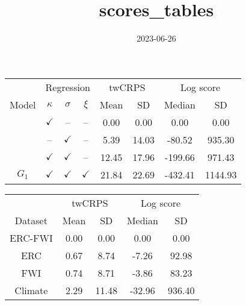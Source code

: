 \documentclass[
]{article}
\title{scores\_tables}
\author{}
\date{\vspace{-2.5em}2023-06-26}
\begin{document}
\maketitle

\begin{tabular}{cccccccc}
\toprule
\multicolumn{1}{c}{ } & \multicolumn{3}{c}{Regression} & \multicolumn{2}{c}{twCRPS} & \multicolumn{2}{c}{Log score} \\
\cmidrule(l{3pt}r{3pt}){2-4} \cmidrule(l{3pt}r{3pt}){5-6} \cmidrule(l{3pt}r{3pt}){7-8}
Model & $\kappa$ & $\sigma$ & $\xi$ & Mean & SD  & Median & SD\\
\midrule
 & $\checkmark$ & -- & -- & 0.00 & 0.00 & 0.00 & 0.00\\

 & -- & $\checkmark$ & -- & 5.39 & 14.03 & -80.52 & 935.30\\

 & $\checkmark$ & $\checkmark$ & -- & 12.45 & 17.96 & -199.66 & 971.43\\

\multirow{-4}{*}{\centering\arraybackslash $G_1$} & $\checkmark$ & $\checkmark$ & $\checkmark$ & 21.84 & 22.69 & -432.41 & 1144.93\\
\bottomrule
\end{tabular}

\begin{tabular}{ccccc}
\toprule
\multicolumn{1}{c}{ } & \multicolumn{2}{c}{twCRPS} & \multicolumn{2}{c}{Log score} \\
\cmidrule(l{3pt}r{3pt}){2-3} \cmidrule(l{3pt}r{3pt}){4-5}
Dataset & Mean & SD  & Median & SD\\
\midrule
ERC-FWI & 0.00 & 0.00 & 0.00 & 0.00\\
ERC & 0.67 & 8.74 & -7.26 & 92.98\\
FWI & 0.74 & 8.71 & -3.86 & 83.23\\
Climate & 2.29 & 11.48 & -32.96 & 936.40\\
\bottomrule
\end{tabular}
\end{document}
